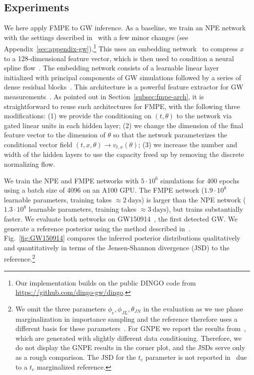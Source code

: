 \documentclass{article}
\theoremstyle{remark}
\begin{document}
\subsection{Experiments}


We here apply FMPE to GW inference. As a baseline, we train an NPE network with the settings described in~\cite{Dax:2021tsq} with a few minor changes (see Appendix~\ref{sec:appendix-gw}).\footnote{Our implementation builds on the public DINGO code from \url{https://github.com/dingo-gw/dingo}.} This uses an embedding network~\cite{radev2020bayesflow} to compress $x$ to a 128-dimensional feature vector, which is then used to condition a neural spline flow~\cite{durkan2019neural}. The embedding network consists of a learnable linear layer initialized with principal components of GW simulations followed by a series of dense residual blocks~\cite{he2015deep}. This architecture is a powerful feature extractor for GW measurements~\cite{Dax:2021tsq}. As pointed out in Section~\ref{subsec:fmpe-arch}, it is straightforward to reuse such architectures for FMPE, with the following three modifications: (1) we provide the conditioning on $(t,\theta)$ to the network via gated linear units in each hidden layer; (2) we change the dimension of the final feature vector to the dimension of $\theta$ so that the network parameterizes the conditional vector field $(t,x,\theta)\rightarrow v_{t,x}(\theta)$; (3) we increase the number and width of the hidden layers to use the capacity freed up by removing the discrete normalizing flow.


We train the NPE and FMPE networks with $5\cdot 10^6$ simulations for 400 epochs using a batch size of 4096 on an A100 GPU. The FMPE network ($1.9\cdot 10^8$ learnable parameters, training takes $\approx 2~\text{days}$) is larger than the NPE network ($1.3\cdot 10^8$ learnable parameters, training takes $\approx 3~\text{days}$), but trains substantially faster. We evaluate both networks on GW150914~\cite{Abbott:2016blz}, the first detected GW. We generate a reference posterior using the method described in~\cite{Dax:2022pxd}. Fig.~\ref{fig:GW150914} compares the inferred posterior distributions qualitatively and quantitatively in terms of the Jensen-Shannon divergence (JSD) to the reference.\footnote{We omit the three parameters $\phi_\text{c},\phi_{JL},\theta_{JN}$ in the evaluation as we use phase marginalization in importance sampling and the reference therefore uses a different basis for these parameters~\cite{Dax:2022pxd}. For GNPE we report the results from~\cite{Dax:2021tsq}, which are generated with slightly different data conditioning. Therefore, we do not display the GNPE results in the corner plot, and the JSDs serve only as a rough comparison. The JSD for the $t_\text{c}$ parameter is not reported in~\cite{Dax:2021tsq} due to a $t_\text{c}$ marginalized reference.} 
\end{document}
